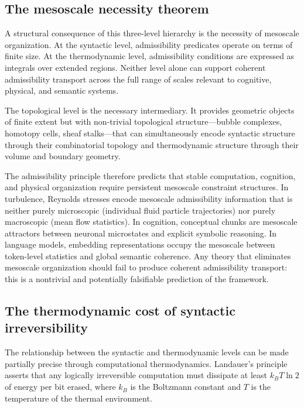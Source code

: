 \documentclass[12pt, a4paper]{article}
\theoremstyle{plain}
\theoremstyle{definition}
\theoremstyle{remark}
\begin{document}
\subsection{The mesoscale necessity theorem}

A structural consequence of this three-level hierarchy is the necessity of mesoscale
organization. At the syntactic level, admissibility predicates operate on terms of
finite size. At the thermodynamic level, admissibility conditions are expressed as
integrals over extended regions. Neither level alone can support coherent admissibility
transport across the full range of scales relevant to cognitive, physical, and semantic
systems.

The topological level is the necessary intermediary. It provides geometric objects of
finite extent but with non-trivial topological structure—bubble complexes, homotopy
cells, sheaf stalks—that can simultaneously encode syntactic structure through their
combinatorial topology and thermodynamic structure through their volume and boundary
geometry.

The admissibility principle therefore predicts that stable computation, cognition, and
physical organization require persistent mesoscale constraint structures. In turbulence,
Reynolds stresses encode mesoscale admissibility information that is neither purely
microscopic (individual fluid particle trajectories) nor purely macroscopic (mean flow
statistics). In cognition, conceptual chunks are mesoscale attractors between neuronal
microstates and explicit symbolic reasoning. In language models, embedding
representations occupy the mesoscale between token-level statistics and global semantic
coherence. Any theory that eliminates mesoscale organization should fail to produce
coherent admissibility transport: this is a nontrivial and potentially falsifiable
prediction of the framework.

\subsection{The thermodynamic cost of syntactic irreversibility}

The relationship between the syntactic and thermodynamic levels can be made partially
precise through computational thermodynamics. Landauer's principle asserts that any
logically irreversible computation must dissipate at least $k_B T \ln 2$ of energy
per bit erased, where $k_B$ is the Boltzmann constant and $T$ is the temperature of
the thermal environment.
\end{document}
